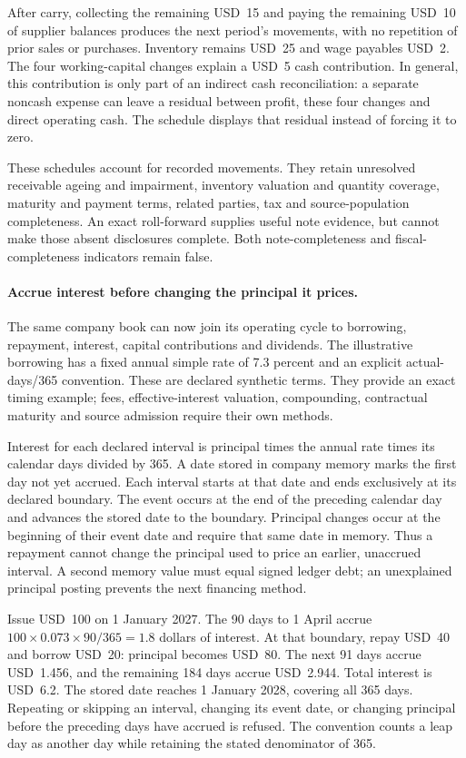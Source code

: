 After carry, collecting the remaining USD~15 and paying the remaining USD~10 of
supplier balances produces the next period's movements, with no repetition of
prior sales or purchases. Inventory remains USD~25 and wage payables USD~2.
The four working-capital changes explain a USD~5 cash contribution. In general,
this contribution is only part of an indirect cash reconciliation: a separate
noncash expense can leave a residual between profit, these four changes and direct
operating cash. The schedule displays that residual instead of forcing it to zero.

These schedules account for recorded movements. They retain unresolved receivable
ageing and impairment, inventory valuation and quantity coverage, maturity and
payment terms, related parties, tax and source-population completeness. An exact
roll-forward supplies useful note evidence, but cannot make those absent disclosures
complete. Both note-completeness and fiscal-completeness indicators remain false.


\paragraph{Accrue interest before changing the principal it prices.}
The same company book can now join its operating cycle to borrowing, repayment,
interest, capital contributions and dividends. The illustrative borrowing has a
fixed annual simple rate of 7.3 percent and an explicit actual-days/365 convention.
These are declared synthetic terms. They provide an exact timing example; fees,
effective-interest valuation, compounding, contractual maturity and source
admission require their own methods.

Interest for each declared interval is principal times the annual rate times its
calendar days divided by 365. A date stored in company memory marks the first day
not yet accrued. Each interval starts at that date and ends exclusively at its
declared boundary. The event occurs at the end of the preceding calendar day and
advances the stored date to the boundary. Principal changes occur at the beginning
of their event date and require that same date in memory. Thus a repayment cannot
change the principal used to price an earlier, unaccrued interval. A second memory
value must equal signed ledger debt; an unexplained principal posting prevents the
next financing method.

Issue USD~100 on 1 January 2027. The 90 days to 1 April accrue
$100\times0.073\times90/365=1.8$ dollars of interest. At that boundary, repay
USD~40 and borrow USD~20: principal becomes USD~80. The next 91 days accrue
USD~1.456, and the remaining 184 days accrue USD~2.944. Total interest is USD~6.2.
The stored date reaches 1 January 2028, covering all 365 days. Repeating or skipping
an interval, changing its event date, or changing principal before the preceding
days have accrued is refused. The convention counts a leap day as another day
while retaining the stated denominator of 365.

